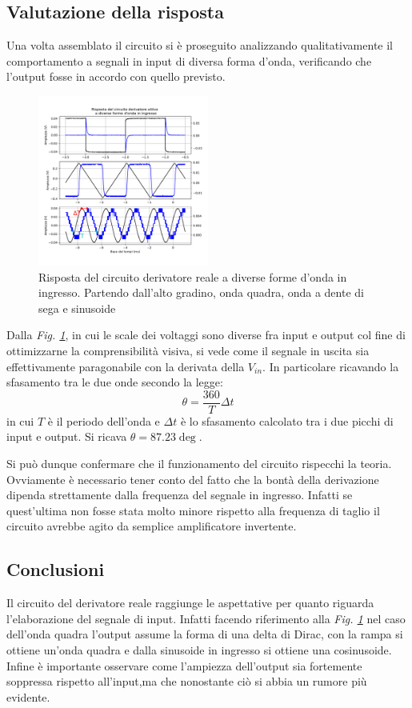 \documentclass[journal]{IEEEtran}
\begin{document}
\subsection{\textbf{Valutazione della risposta}}
Una volta assemblato il circuito si è proseguito analizzando qualitativamente il comportamento a segnali in input di diversa forma d'onda, verificando che l'output fosse in accordo con quello previsto.

\begin{figure}[H]%
\begin{center}
\includegraphics[width=0.50\textwidth]{analysis/output/OPA-differentiator.pdf}
\caption{Risposta del circuito derivatore reale a diverse forme d’onda in ingresso. Partendo dall’alto gradino, onda quadra, onda a dente di sega e sinusoide}
\label{fig:derivatore}
\end{center}
\end{figure}
Dalla \textit{Fig. \ref{fig:derivatore}}, in cui le scale dei voltaggi sono diverse fra input e output col fine di ottimizzarne la comprensibilità visiva, si vede come il segnale in uscita sia effettivamente paragonabile con la derivata della $V_{in}$. In particolare ricavando la sfasamento tra le due onde secondo la legge:
\[\theta = \frac{360}{T}\Delta t\]
in cui $T$ è il periodo dell'onda e $\Delta t$ è lo sfasamento calcolato tra i due picchi di input e output. Si ricava $\theta = 87.23 \deg$.

Si può dunque confermare che il funzionamento del circuito rispecchi la teoria. Ovviamente è necessario tener conto del fatto che la bontà della derivazione dipenda strettamente dalla frequenza del segnale in ingresso. Infatti se quest'ultima non fosse stata molto minore rispetto alla frequenza di taglio il circuito avrebbe agito da semplice amplificatore invertente.
\subsection{\textbf{Conclusioni}}
Il circuito del derivatore reale raggiunge le aspettative per quanto riguarda l'elaborazione del segnale di input. Infatti facendo riferimento alla \textit{Fig. \ref{fig:derivatore}} nel caso dell'onda quadra l'output assume la forma di una delta di Dirac, con la rampa si ottiene un'onda quadra e dalla sinusoide in ingresso si ottiene una cosinusoide. Infine è importante osservare come l'ampiezza dell'output sia fortemente soppressa rispetto all'input,ma che nonostante ciò si abbia un rumore più evidente.
\end{document}
